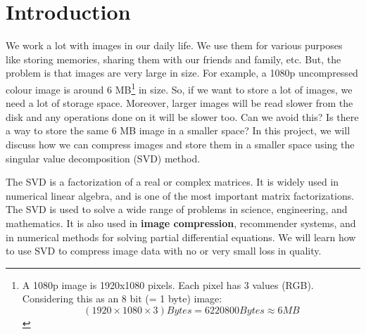 \section{Introduction}

	We work a lot with images in our daily life. We use them for various purposes like storing memories, sharing them with our friends and family, etc. But, the problem is that images are very large in size. For example, a 1080p uncompressed colour image is around 6 MB\footnote{A 1080p image is 1920x1080 pixels. Each pixel has 3 values (RGB). Considering this as an 8 bit (= 1 byte) image: $$(1920\times1080\times3) Bytes = 6220800 Bytes \approx 6 MB $$} in size. So, if we want to store a lot of images, we need a lot of storage space. Moreover, larger images will be read slower from the disk and any operations done on it will be slower too. Can we avoid this? Is there a way to store the same 6 MB image in a smaller space? In this project, we will discuss how we can compress images and store them in a smaller space using the singular value decomposition (SVD) method.

	\vspace{2mm}

	The SVD is a factorization of a real or complex matrices. It is widely used in numerical linear algebra, and is one of the most important matrix factorizations. The SVD is used to solve a wide range of problems in science, engineering, and mathematics. It is also used in \textbf{image compression}, recommender systems, and in numerical methods for solving partial differential equations. We will learn how to use SVD to compress image data with no or very small loss in quality.
